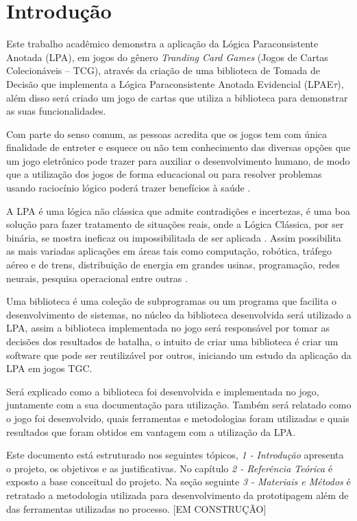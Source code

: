 
\chapter{Introdução}

Este trabalho acadêmico demonstra a aplicação da Lógica Paraconsistente Anotada (LPA), em jogos do gênero \textit{Tranding Card Games} (Jogos de Cartas Colecionáveis – TCG), através da criação de uma biblioteca de Tomada de Decisão que implementa a Lógica Paraconsistente Anotada Evidencial (LPAE$\tau$), além disso será criado um jogo de cartas que utiliza a biblioteca para demonstrar as suas funcionalidades.

Com parte do senso comum, as pessoas acredita que os jogos tem com única finalidade de entreter e esquece ou não tem conhecimento das diversas opções que um jogo eletrônico pode trazer para auxiliar o desenvolvimento humano, de modo que a utilização dos jogos de forma educacional ou para resolver problemas usando raciocínio lógico poderá trazer benefícios à saúde \cite{fabio-luis-lpa}.

A LPA é uma lógica não clássica que admite contradições e incertezas, é uma boa solução para fazer tratamento de situações reais, onde a Lógica Clássica, por ser binária, se mostra ineficaz ou impossibilitada de ser aplicada \cite{metodos-lpa-2006}. Assim possibilita as mais variadas aplicações em áreas tais como computação, robótica, tráfego aéreo e de trens, distribuição de energia em grandes usinas, programação, redes neurais, pesquisa operacional entre outras \cite{tomda-decisao-lpa-2011}.

Uma biblioteca é uma coleção de subprogramas ou um programa que facilita o desenvolvimento de sistemas, no núcleo da biblioteca desenvolvida será utilizado a
LPA, assim a biblioteca implementada no jogo será responsável por tomar as decisões dos resultados de batalha, o intuito de criar uma biblioteca é criar um software que pode ser reutilizável por outros, iniciando um estudo da aplicação da LPA em jogos TGC.

Será explicado como a biblioteca foi desenvolvida e implementada no jogo, juntamente com a sua documentação para utilização. Também será relatado como o
jogo foi desenvolvido, quais ferramentas e metodologias foram utilizadas e quais resultados que foram obtidos em vantagem com a utilização da LPA.

Este documento está estruturado nos seguintes tópicos, \textit{1 - Introdução} apresenta o projeto, os objetivos e as justificativas. No capítulo \textit{2 - Referência Teórica} é
exposto a base conceitual do projeto. Na seção seguinte \textit{3 - Materiais e Métodos} é retratado a metodologia utilizada para desenvolvimento da prototipagem além de das ferramentas utilizadas no processo. [EM CONSTRUÇÃO]

